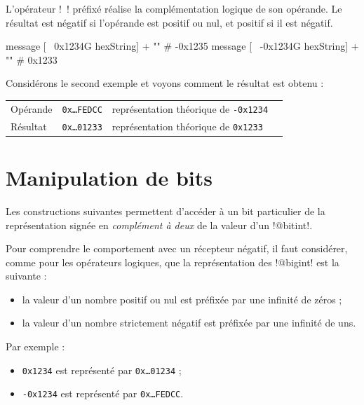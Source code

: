 L'opérateur \ggsq!~! préfixé réalise la complémentation logique de son opérande. Le résultat est négatif si l'opérande est positif ou nul, et positif si il est négatif.

\begin{galgas4}
message [~  0x1234G hexString] + "\n" # -0x1235
message [~ -0x1234G hexString] + "\n" # 0x1233
\end{galgas4}

Considérons le second exemple et voyons comment le résultat est obtenu :

\begin{tabular}{llll}
Opérande & \texttt{0x…FEDCC} & représentation théorique de \texttt{-0x1234}\\
Résultat & \texttt{0x…01233} & représentation théorique de \texttt{0x1233} \\
\end{tabular}











\section{Manipulation de bits}

Les constructions suivantes permettent d'accéder à un bit particulier de la représentation signée en \emph{complément à deux} de la valeur d'un \ggsq!@bitint!.

Pour comprendre le comportement avec un récepteur négatif, il faut considérer, comme pour les opérateurs logiques, que la représentation des \ggsq!@bigint! est la suivante :
\begin{itemize}
  \item la valeur d'un nombre positif ou nul est préfixée par une infinité de zéros ;
  \item la valeur d'un nombre strictement négatif est préfixée par une infinité de uns.
\end{itemize}

Par exemple :
\begin{itemize}
  \item \texttt{0x1234} est représenté par \texttt{0x…01234} ;
  \item \texttt{-0x1234} est représenté par \texttt{0x…FEDCC}.
\end{itemize}


